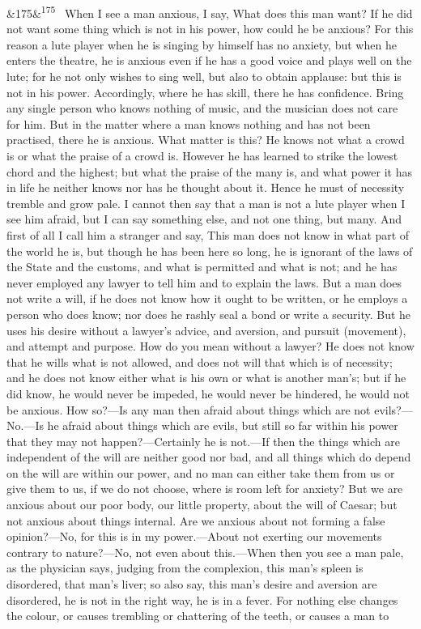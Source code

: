 \documentclass[12pt]{article}
\newcommand{\para}[1][]{\par\noindent\ifx&#1&\else\textsuperscript{\footnotesize #1}~\fi}
\begin{document}
\para[175] When I see a man anxious, I say, What does this man want? If he did not want some thing which is not in his power, how could he be anxious? For this reason a lute player when he is singing by himself has no anxiety, but when he enters the theatre, he is anxious even if he has a good voice and plays well on the lute; for he not only wishes to sing well, but also to obtain applause: but this is not in his power. Accordingly, where he has skill, there he has confidence. Bring any single person who knows nothing of music, and the musician does not care for him. But in the matter where a man knows nothing and has not been practised, there he is anxious. What matter is this? He knows not what a crowd is or what the praise of a crowd is. However he has learned to strike the lowest chord and the highest; but what the praise of the many is, and what power it has in life he neither knows nor has he thought about it. Hence he must of necessity tremble and grow pale. I cannot then say that a man is not a lute player when I see him afraid, but I can say something else, and not one thing, but many. And first of all I call him a stranger and say, This man does not know in what part of the world he is, but though he has been here so long, he is ignorant of the laws of the State and the customs, and what is permitted and what is not; and he has never employed any lawyer to tell him and to explain the laws. But a man does not write a will, if he does not know how it ought to be written, or he employs a person who does know; nor does he rashly seal a bond or write a security. But he uses his desire without a lawyer's advice, and aversion, and pursuit (movement), and attempt and purpose. How do you mean without a lawyer? He does not know that he wills what is not allowed, and does not will that which is of necessity; and he does not know either what is his own or what is another man's; but if he did know, he would never be impeded, he would never be hindered, he would not be anxious. How so?—Is any man then afraid about things which are not evils?—No.—Is he afraid about things which are evils, but still so far within his power that they may not happen?—Certainly he is not.—If then the things which are independent of the will are neither good nor bad, and all things which do depend on the will are within our power, and no man can either take them from us or give them to us, if we do not choose, where is room left for anxiety? But we are anxious about our poor body, our little property, about the will of Caesar; but not anxious about things internal. Are we anxious about not forming a false opinion?—No, for this is in my power.—About not exerting our movements contrary to nature?—No, not even about this.—When then you see a man pale, as the physician says, judging from the complexion, this man's spleen is disordered, that man's liver; so also say, this man's desire and aversion are disordered, he is not in the right way, he is in a fever. For nothing else changes the colour, or causes trembling or chattering of the teeth, or causes a man to
\end{document}
